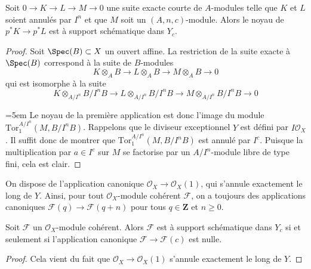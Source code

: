 \begin{lemma}
\label{lemma-almost-exactness}
Soit $0 \to K \to L \to M \to 0$ une suite exacte courte de $A$-modules telle que $K$ et $L$ soient annulés par $I^n$ et que $M$ soit un $(A, n, c)$-module. Alors le noyau de $p^*K \to p^*L$ est à support schématique dans $Y_c$.
\end{lemma}

\begin{proof}
Soit $\Spec(B) \subset X$ un ouvert affine. La restriction de la suite exacte à $\Spec(B)$ correspond à la suite de $B$-modules
$$
K \otimes_A B \to L \otimes_A B \to M \otimes_A B \to 0
$$
qui est isomorphe à la suite
$$
K \otimes_{A/I^n} B/I^nB \to
L \otimes_{A/I^n} B/I^nB \to
M \otimes_{A/I^n} B/I^nB \to 0
$$
{\emergencystretch=5em
Le noyau de la première application est donc l'image du module $\text{Tor}_1^{A/I^n}(M, B/I^nB)$. Rappelons que le diviseur exceptionnel $Y$ est défini par $I\mathcal{O}_X$. Il suffit donc de montrer que $\text{Tor}_1^{A/I^n}(M, B/I^nB)$ est annulé par $I^c$. Puisque la multiplication par $a \in I^c$ sur $M$ se factorise par un $A/I^n$-module libre de type fini, cela est clair.
\par}
\end{proof}

\noindent
On dispose de l'application canonique $\mathcal{O}_X \to \mathcal{O}_X(1)$, qui s'annule exactement le long de $Y$. Ainsi, pour tout $\mathcal{O}_X$-module cohérent $\mathcal{F}$, on a toujours des applications canoniques $\mathcal{F}(q) \to \mathcal{F}(q + n)$ pour tous $q \in \mathbf{Z}$ et $n \geq 0$.

\begin{lemma}
\label{lemma-annihilated}
Soit $\mathcal{F}$ un $\mathcal{O}_X$-module cohérent. Alors $\mathcal{F}$ est à support schématique dans $Y_c$ si et seulement si l'application canonique $\mathcal{F} \to \mathcal{F}(c)$ est nulle.
\end{lemma}

\begin{proof}
Cela vient du fait que $\mathcal{O}_X \to \mathcal{O}_X(1)$ s'annule exactement le long de $Y$.
\end{proof}

